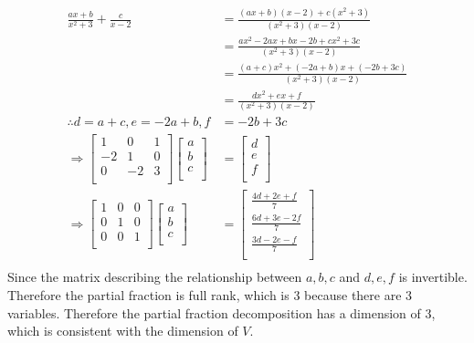 \documentclass[10pt]{article}
\begin{document}
{{		\begin{align}
			\frac{ax+b}{x^2+3}+\frac{c}{x-2} &= \frac{(ax+b)(x-2)+c(x^2+3)}{(x^2+3)(x-2)} \\
			&= \frac{ax^2-2ax+bx-2b+cx^2+3c}{(x^2+3)(x-2)} \\
			&= \frac{(a+c)x^2+(-2a+b)x+(-2b+3c)}{(x^2+3)(x-2)} \\
			&= \frac{dx^2+ex+f}{(x^2+3)(x-2)} \\
			\therefore d = a+c, e = -2a+b, f &= -2b+3c \\
			\Rightarrow 
			\begin{bmatrix}
				1 & 0 & 1 \\
				-2 & 1 & 0 \\
				0 & -2 & 3 \\
			\end{bmatrix}
			\begin{bmatrix}
				a \\
				b \\
				c \\
			\end{bmatrix}
			&=
			\begin{bmatrix}
				d \\
				e \\
				f \\
			\end{bmatrix} \\
			\Rightarrow
			\begin{bmatrix}
				1 & 0 & 0 \\
				0 & 1 & 0 \\
				0 & 0 & 1 \\
			\end{bmatrix}
			\begin{bmatrix}
				a \\
				b \\
				c \\
			\end{bmatrix}
			&=
			\begin{bmatrix}
				\frac{4d + 2e + f}{7} \\
				\frac{6d + 3e - 2f}{7} \\
				\frac{3d - 2e - f}{7} \\
			\end{bmatrix} \\
		\end{align}
		Since the matrix describing the relationship
		between $a, b, c$ and $d, e, f$ is invertible. Therefore the partial fraction is 
		full rank, which is 3 because there are 3 variables. Therefore the partial fraction
		decomposition has a dimension of 3, which is consistent with the dimension of $V$.
	}
}
\end{document}
